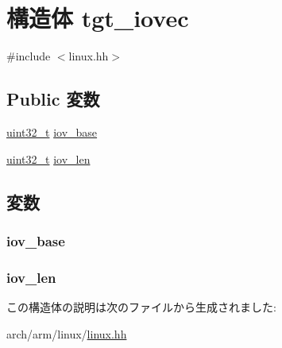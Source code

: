 \hypertarget{structArmLinux32_1_1tgt__iovec}{
\section{構造体 tgt\_\-iovec}
\label{structArmLinux32_1_1tgt__iovec}
}


{\ttfamily \#include $<$linux.hh$>$}\subsection*{Public 変数}
\begin{DoxyCompactItemize}
\item 
\hyperlink{Type_8hh_a435d1572bf3f880d55459d9805097f62}{uint32\_\-t} \hyperlink{structArmLinux32_1_1tgt__iovec_af5bf0cb9fff16bc106498d6bf5f1fd8e}{iov\_\-base}
\item 
\hyperlink{Type_8hh_a435d1572bf3f880d55459d9805097f62}{uint32\_\-t} \hyperlink{structArmLinux32_1_1tgt__iovec_a6293656a91579f4d791f1bf4c16f9095}{iov\_\-len}
\end{DoxyCompactItemize}


\subsection{変数}
\hypertarget{structArmLinux32_1_1tgt__iovec_af5bf0cb9fff16bc106498d6bf5f1fd8e}{
\subsubsection[{iov\_\-base}]{ {\bf iov\_\-base}}}
\label{structArmLinux32_1_1tgt__iovec_af5bf0cb9fff16bc106498d6bf5f1fd8e}
\hypertarget{structArmLinux32_1_1tgt__iovec_a6293656a91579f4d791f1bf4c16f9095}{
\subsubsection[{iov\_\-len}]{ {\bf iov\_\-len}}}
\label{structArmLinux32_1_1tgt__iovec_a6293656a91579f4d791f1bf4c16f9095}


この構造体の説明は次のファイルから生成されました:\begin{DoxyCompactItemize}
\item 
arch/arm/linux/\hyperlink{arch_2arm_2linux_2linux_8hh}{linux.hh}\end{DoxyCompactItemize}
